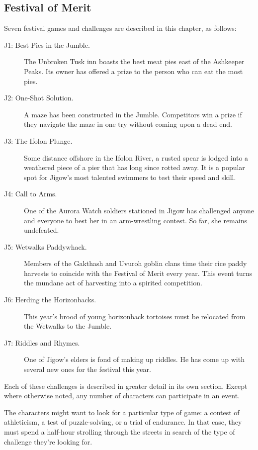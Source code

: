 \documentclass[letterpaper, 11pt, bg=full, twocolumn]{dndbook}
\begin{document}
\subsection{Festival of Merit}

Seven festival games and challenges are described in this chapter, as follows:

\begin{description}
\item[J1: Best Pies in the Jumble.] The Unbroken Tusk inn boasts the best meat pies east of the Ashkeeper Peaks. Its owner has offered a prize to the person who can eat the most pies.
\item[J2: One-Shot Solution.] A maze has been constructed in the Jumble. Competitors win a prize if they navigate the maze in one try without coming upon a dead end.
\item[J3: The Ifolon Plunge.] Some distance offshore in the Ifolon River, a rusted spear is lodged into a weathered piece of a pier that has long since rotted away. It is a popular spot for Jigow's most talented swimmers to test their speed and skill.
\item[J4: Call to Arms.] One of the Aurora Watch soldiers stationed in Jigow has challenged anyone and everyone to best her in an arm-wrestling contest. So far, she remains undefeated.
\item[J5: Wetwalks Paddywhack.] Members of the Gakthash and Uvuroh goblin clans time their rice paddy harvests to coincide with the Festival of Merit every year. This event turns the mundane act of harvesting into a spirited competition.
\item[J6: Herding the Horizonbacks.] This year's brood of young horizonback tortoises must be relocated from the Wetwalks to the Jumble.
\item[J7: Riddles and Rhymes.] One of Jigow's elders is fond of making up riddles. He has come up with several new ones for the festival this year.
\end{description}

Each of these challenges is described in greater detail in its own section. Except where otherwise noted, any number of characters can participate in an event.

The characters might want to look for a particular type of game: a contest of athleticism, a test of puzzle-solving, or a trial of endurance. In that case, they must spend a half-hour strolling through the streets in search of the type of challenge they're looking for.
\end{document}

